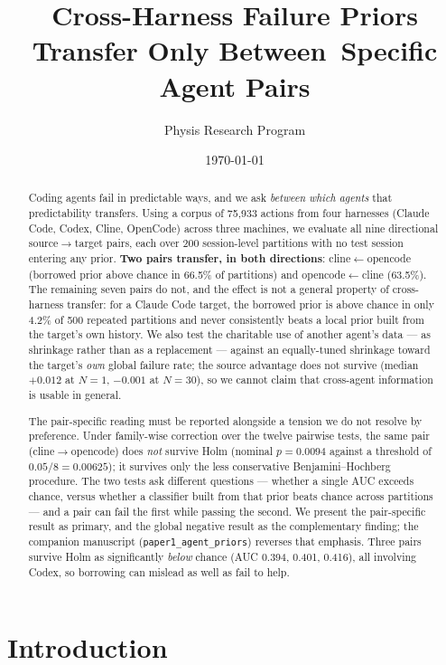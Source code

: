 \documentclass[11pt]{article}
\title{Cross-Harness Failure Priors Transfer Only Between\
Specific Agent Pairs}
\author{Physis Research Program}
\date{\today}
\begin{document}
\maketitle

\begin{abstract}
Coding agents fail in predictable ways, and we ask \emph{between which agents}
that predictability transfers. Using a corpus of 75,933 actions from four
harnesses (Claude Code, Codex, Cline, OpenCode) across three machines, we
evaluate all nine directional source$\to$target pairs, each over 200
session-level partitions with no test session entering any prior.
\textbf{Two pairs transfer, in both directions}: cline$\leftarrow$opencode
(borrowed prior above chance in 66.5\% of partitions) and
opencode$\leftarrow$cline (63.5\%). The remaining seven pairs do not, and the
effect is not a general property of cross-harness transfer: for a Claude Code
target, the borrowed prior is above chance in only 4.2\% of 500 repeated
partitions and never consistently beats a local prior built from the target's
own history. We also test the charitable use of another agent's data --- as
shrinkage rather than as a replacement --- against an equally-tuned shrinkage
toward the target's \emph{own} global failure rate; the source advantage does
not survive (median $+0.012$ at $N=1$, $-0.001$ at $N=30$), so we cannot claim
that cross-agent information is usable in general.

The pair-specific reading must be reported alongside a tension we do not
resolve by preference. Under family-wise correction over the twelve pairwise
tests, the same pair (cline$\to$opencode) does \emph{not} survive Holm
(nominal $p = 0.0094$ against a threshold of $0.05/8 = 0.00625$); it survives
only the less conservative Benjamini--Hochberg procedure. The two tests ask
different questions --- whether a single AUC exceeds chance, versus whether a
classifier built from that prior beats chance across partitions --- and a pair
can fail the first while passing the second. We present the pair-specific
result as primary, and the global negative result as the complementary
finding; the companion manuscript
(\texttt{paper1\_agent\_priors}) reverses that emphasis. Three pairs survive
Holm as significantly \emph{below} chance (AUC 0.394, 0.401, 0.416), all
involving Codex, so borrowing can mislead as well as fail to help.
\end{abstract}

\section{Introduction}
\end{document}
